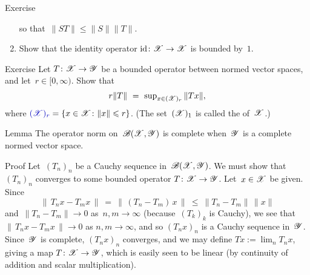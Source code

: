 \documentclass[a]{subfiles}
\begin{document}
\begin{parsec}[hilb]
\begin{point}{Exercise}
\begin{enumerate}
so that~$\|ST\|\leq\|S\|\|T\|$.
\item
Show that the identity operator $\operatorname{id}\colon \mathscr{X}\to \mathscr{X}$
is bounded by~$1$.
\end{enumerate}
\end{point}
\begin{point}{Exercise}%
Let $T\colon \mathscr{X}\to\mathscr{Y}$
be a bounded operator between normed vector spaces,
	and let~$r\in[0,\infty)$.
Show that 
	\begin{equation*}
		\textstyle
		r\|T\|\ =\ \sup_{x\in (\mathscr{X})_r} \|Tx\|,
	\end{equation*}
where $\Define{(\scrX)_r}=\{x\in \scrX\colon \|x\|\leq r\}$.%
%
	(The set~$(\mathscr{X})_1$
	is called the  of~$\mathscr{X}$.)%
\end{point}
\begin{point}{Lemma}%
The operator norm on~$\mathscr{B}(\mathscr{X},\mathscr{Y})$ is complete
when~$\mathscr{Y}$ is a complete normed vector space.
\begin{point}{Proof}%
Let~$(T_n)_n$ be a Cauchy sequence in~$\mathscr{B}(\mathscr{X},\mathscr{Y})$.
We must show that~$(T_n)_n$ converges to some
bounded operator $T\colon \mathscr{X}\to\mathscr{Y}$.
Let~$x\in \mathscr{X}$ be given.
Since 
\begin{equation*}
\|\,T_nx - T_mx\,\|\ =\ \|\,(T_n-T_m)\,x\,\|\ \leq\  \|T_n-T_m\|\,\|x\|
\end{equation*}
and~$\|T_n-T_m\|\to 0$ as~$n,m\to \infty$ 
(because~$(T_k)_k$ is Cauchy),
we see that $\|\,T_nx-T_mx\,\|\to 0$ as $n,m\to \infty$,
and so $(T_nx)_n$ is a Cauchy sequence in~$\mathscr{Y}$.
Since~$\mathscr{Y}$ is complete,
 $(T_nx)_n$ converges,
and  we may define $Tx:=\lim_n T_nx$,
giving a map $T\colon \mathscr{X}\to \mathscr{Y}$,
which is easily seen to be linear
(by continuity of addition and scalar multiplication).


\end{point}
\end{point}
\end{parsec}
\end{document}
